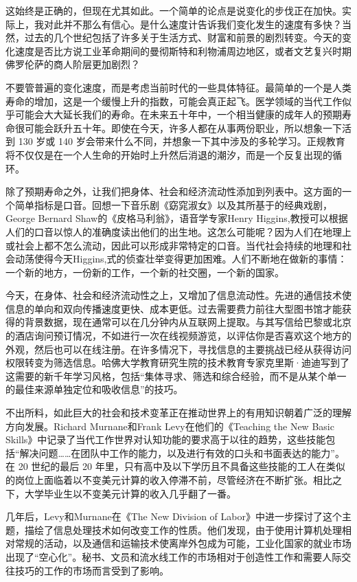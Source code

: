 这始终是正确的，但现在尤其如此。一个简单的论点是说变化的步伐正在加快。实际上，我对此并不那么有信心。是什么速度计告诉我们变化发生的速度有多快？当然，过去的几个世纪包括了许多关于生活方式、财富和前景的剧烈转变。今天的变化速度是否比方说工业革命期间的曼彻斯特和利物浦周边地区，或者文艺复兴时期佛罗伦萨的商人阶层更加剧烈？

不要管普遍的变化速度，而是考虑当前时代的一些具体特征。最简单的一个是人类寿命的增加，这是一个缓慢上升的指数，可能会真正起飞。医学领域的当代工作似乎可能会大大延长我们的寿命。在未来五十年中，一个相当健康的成年人的预期寿命很可能会跃升五十年。即使在今天，许多人都在从事两份职业，所以想象一下活到 130 岁或 140 岁会带来什么不同，并想象一下其中涉及的多轮学习。正规教育将不仅仅是在一个人生命的开始时上升然后消退的潮汐，而是一个反复出现的循环。

除了预期寿命之外，让我们把身体、社会和经济流动性添加到列表中。这方面的一个简单指标是口音。回想一下音乐剧《窈窕淑女》以及其所基于的经典戏剧，George Bernard Shaw的《皮格马利翁》，语音学专家Henry Higgins,教授可以根据人们的口音以惊人的准确度读出他们的出生地。这怎么可能呢？因为人们在地理上或社会上都不怎么流动，因此可以形成非常特定的口音。当代社会持续的地理和社会动荡使得今天Higgins,式的侦查壮举变得更加困难。人们不断地在做新的事情：一个新的地方，一份新的工作，一个新的社交圈，一个新的国家。

今天，在身体、社会和经济流动性之上，又增加了信息流动性。先进的通信技术使信息的单向和双向传播速度更快、成本更低。过去需要费力前往大型图书馆才能获得的背景数据，现在通常可以在几分钟内从互联网上提取。与其写信给巴黎或北京的酒店询问预订情况，不如进行一次在线视频游览，以评估你是否喜欢这个地方的外观，然后也可以在线注册。在许多情况下，寻找信息的主要挑战已经从获得访问权限转变为筛选信息。哈佛大学教育研究生院的技术教育专家克里斯·迪迪写到了这需要的新千年学习风格，包括“集体寻求、筛选和综合经验，而不是从某个单一的最佳来源单独定位和吸收信息”的技巧。

不出所料，如此巨大的社会和技术变革正在推动世界上的有用知识朝着广泛的理解方向发展。Richard Murnane和Frank Levy在他们的《Teaching the New Basic Skills》中记录了当代工作世界对认知功能的要求高于以往的趋势，这些技能包括“解决问题……在团队中工作的能力，以及进行有效的口头和书面表达的能力”。在 20 世纪的最后 20 年里，只有高中及以下学历且不具备这些技能的工人在类似的岗位上面临着以不变美元计算的收入停滞不前，尽管经济在不断扩张。相比之下，大学毕业生以不变美元计算的收入几乎翻了一番。

几年后，Levy和Murnane在《The New Division of Labor》中进一步探讨了这个主题，描绘了信息处理技术如何改变工作的性质。他们发现，由于使用计算机处理相对常规的活动，以及通信和运输技术使离岸外包成为可能，工业化国家的就业市场出现了“空心化”。秘书、文员和流水线工作的市场相对于创造性工作和需要人际交往技巧的工作的市场而言受到了影响。

